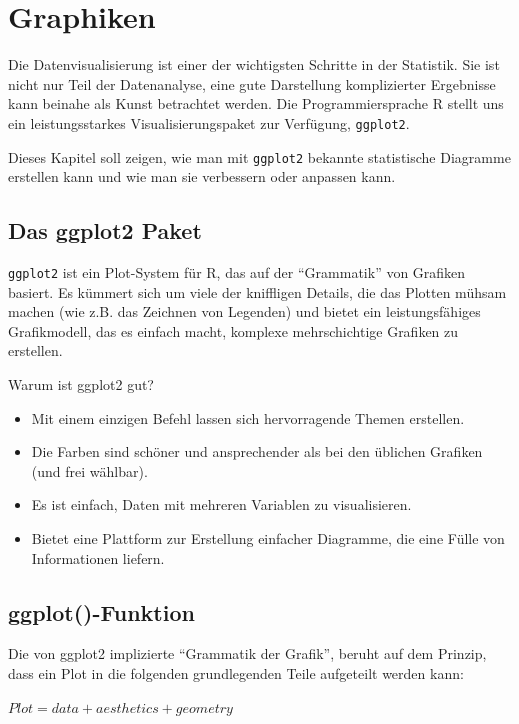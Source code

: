 \documentclass[
]{book}
\begin{document}
\chapter{Graphiken}\label{graphiken}

Die Datenvisualisierung ist einer der wichtigsten Schritte in der Statistik. Sie ist nicht nur Teil der Datenanalyse, eine gute Darstellung komplizierter Ergebnisse kann beinahe als Kunst betrachtet werden. Die Programmiersprache R stellt uns ein leistungsstarkes Visualisierungspaket zur Verfügung, \texttt{ggplot2}.

Dieses Kapitel soll zeigen, wie man mit \texttt{ggplot2} bekannte statistische Diagramme erstellen kann und wie man sie verbessern oder anpassen kann.

\section{Das ggplot2 Paket}\label{das-ggplot2-paket}

\texttt{ggplot2} ist ein Plot-System für R, das auf der ``Grammatik'' von Grafiken basiert. Es kümmert sich um viele der kniffligen Details, die das Plotten mühsam machen (wie z.B. das Zeichnen von Legenden) und bietet ein leistungsfähiges Grafikmodell, das es einfach macht, komplexe mehrschichtige Grafiken zu erstellen.

Warum ist ggplot2 gut?

\begin{itemize}
\item
  Mit einem einzigen Befehl lassen sich hervorragende Themen erstellen.
\item
  Die Farben sind schöner und ansprechender als bei den üblichen Grafiken (und frei wählbar).
\item
  Es ist einfach, Daten mit mehreren Variablen zu visualisieren.
\item
  Bietet eine Plattform zur Erstellung einfacher Diagramme, die eine Fülle von Informationen liefern.
\end{itemize}

\section{ggplot()-Funktion}\label{ggplot-funktion}

Die von ggplot2 implizierte ``Grammatik der Grafik'', beruht auf dem Prinzip, dass ein Plot in die folgenden grundlegenden Teile aufgeteilt werden kann:

\(Plot = data + aesthetics + geometry\)
\end{document}
